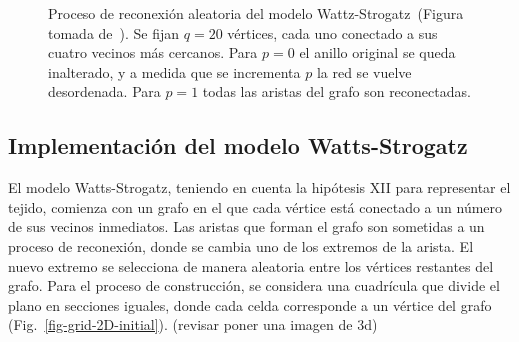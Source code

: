 \begin{figure}[!ht]
\begin{center}
\end{center}\vspace*{-0.6cm}
\caption[Proceso de reconexi\'on aleatoria del modelo Wattz-Strogatz]{Proceso de reconexi\'on aleatoria del modelo Wattz-Strogatz~(Figura tomada de~\cite{complexnetworks}). Se fijan $q = 20$ v\'ertices, cada uno conectado a sus cuatro vecinos m\'as cercanos. Para $p = 0$ el anillo original se queda inalterado, y a medida que se incrementa $p$ la red se vuelve desordenada. Para $p = 1$ todas las aristas del grafo son reconectadas.}
\label{fig-relations}
\end{figure}

\subsection{Implementaci\'on del modelo Watts-Strogatz}
\label{subsec-watts-2}
El modelo Watts-Strogatz, teniendo en cuenta la hipótesis XII para representar el tejido, comienza con un grafo en el que cada vértice está conectado a un número de sus vecinos inmediatos. Las aristas que forman el grafo son sometidas a un proceso de reconexión, donde se cambia uno de los extremos de la arista. El nuevo extremo se selecciona de manera aleatoria entre los vértices restantes del grafo. Para el proceso de construcción, se considera una cuadrícula que divide el plano en secciones iguales, donde cada celda corresponde a un vértice del grafo (Fig.~\ref{fig-grid-2D-initial}). (revisar poner una imagen de 3d)

